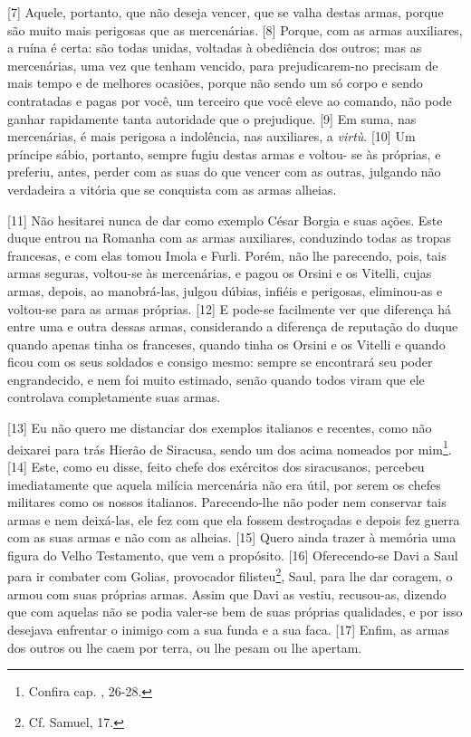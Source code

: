 {[}7{]} Aquele, portanto, que não deseja vencer, que se valha destas
armas, porque são muito mais perigosas que as mercenárias. {[}8{]}
Porque, com as armas auxiliares, a ruína é certa: são todas unidas,
voltadas à obediência dos outros; mas as mercenárias, uma vez que tenham
vencido, para prejudicarem-no precisam de mais tempo e de melhores
ocasiões, porque não sendo um só corpo e sendo contratadas e pagas por
você, um terceiro que você eleve ao comando, não pode ganhar rapidamente
tanta autoridade que o prejudique. {[}9{]} Em suma, nas mercenárias, é
mais perigosa a indolência, nas auxiliares, a \emph{virtù}. {[}10{]} Um
príncipe sábio, portanto, sempre fugiu destas armas e voltou- se às
próprias, e preferiu, antes, perder com as suas do que vencer com as
outras, julgando não verdadeira a vitória que se conquista com as armas
alheias.

{[}11{]} Não hesitarei nunca de dar como exemplo César Borgia e suas
ações. Este duque entrou na Romanha com as armas auxiliares, conduzindo
todas as tropas francesas, e com elas tomou Imola e Furli. Porém, não
lhe parecendo, pois, tais armas seguras, voltou-se às mercenárias, e
pagou os Orsini e os Vitelli, cujas armas, depois, ao manobrá-las,
julgou dúbias, infiéis e perigosas, eliminou-as e voltou-se para as
armas próprias. {[}12{]} E pode-se facilmente ver que diferença há entre
uma e outra dessas armas, considerando a diferença de reputação do duque
quando apenas tinha os franceses, quando tinha os Orsini e os Vitelli e
quando ficou com os seus soldados e consigo mesmo: sempre se encontrará
seu poder engrandecido, e nem foi muito estimado, senão quando todos
viram que ele controlava completamente suas armas.

{[}13{]} Eu não quero me distanciar dos exemplos italianos e recentes,
como não deixarei para trás Hierão de Siracusa, sendo um dos acima
nomeados por mim\footnote{Confira cap. , 26-28.}. {[}14{]} Este, como
eu disse, feito chefe dos exércitos dos siracusanos, percebeu
imediatamente que aquela milícia mercenária não era útil, por serem os
chefes militares como os nossos italianos. Parecendo-lhe não poder nem
conservar tais armas e nem deixá-las, ele fez com que ela fossem
destroçadas e depois fez guerra com as suas armas e não com as alheias.
{[}15{]} Quero ainda trazer à memória uma figura do Velho Testamento,
que vem a propósito. {[}16{]} Oferecendo-se Davi a Saul para ir combater
com Golias, provocador filisteu\footnote{Cf.  Samuel, 17.}, Saul, para
lhe dar coragem, o armou com suas próprias armas. Assim que Davi as
vestiu, recusou-as, dizendo que com aquelas não se podia valer-se bem de
suas próprias qualidades, e por isso desejava enfrentar o inimigo com a
sua funda e a sua faca. {[}17{]} Enfim, as armas dos outros ou lhe caem
por terra, ou lhe pesam ou lhe apertam.

